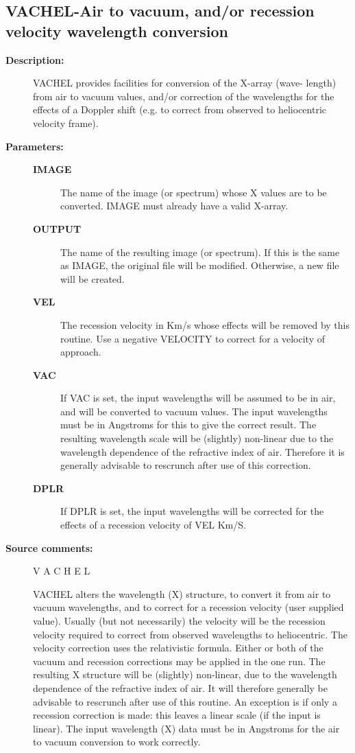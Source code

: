 \subsection{VACHEL-\label{VACHEL}Air to vacuum, and/or recession velocity wavelength conversion}
\begin{description}

\item [\textbf{Description:}]
 VACHEL provides facilities for conversion of the X-array (wave-
 length) from air to vacuum values, and/or correction of the
 wavelengths for the effects of a Doppler shift (e.g. to correct
 from observed to heliocentric velocity frame).

\item [\textbf{Parameters:}]
\begin{description}
\item [\textbf{IMAGE}]
 The name of the image (or spectrum) whose
 X values are to be converted. IMAGE must already
 have a valid X-array.
\item [\textbf{OUTPUT}]
 The name of the resulting image (or
 spectrum).  If this is the same as IMAGE, the
 original file will be modified.  Otherwise, a
 new file will be created.
\item [\textbf{VEL}]
 The recession velocity in Km/s
 whose effects will be removed by this routine.
 Use a negative VELOCITY to correct for a
 velocity of approach.
\item [\textbf{VAC}]
 If VAC is set, the input wavelengths will be assumed
 to be in air, and will be converted to vacuum values.
 The input wavelengths must be in Angstroms for this to
 give the correct result.  The resulting wavelength scale
 will be (slightly) non-linear due to the wavelength
 dependence of the refractive index of air.  Therefore it
 is generally advisable to rescrunch after use of this
 correction.
\item [\textbf{DPLR}]
 If DPLR is set, the input wavelengths will be corrected
 for the effects of a recession velocity of VEL Km/S.
\end{description}

\item [\textbf{Source comments:}]
\begin{terminalv}
 V A C H E L

 VACHEL alters the wavelength (X) structure, to convert it from
 air to vacuum wavelengths, and to correct for a recession velocity
 (user supplied value).  Usually (but not necessarily) the velocity
 will be the recession velocity required to correct from observed
 wavelengths to heliocentric. The velocity correction uses the
 relativistic formula.
     Either or both of the vacuum and recession corrections may be
 applied in the one run.
     The resulting X structure will be (slightly) non-linear, due
 to the wavelength dependence of the refractive index of air. It
 will therefore generally be advisable to rescrunch after use of
 this routine.  An exception is if only a recession correction is
 made: this leaves a linear scale (if the input is linear).
     The input wavelength (X) data must be in Angstroms for the
 air to vacuum conversion to work correctly.



\end{terminalv}
\end{description}
